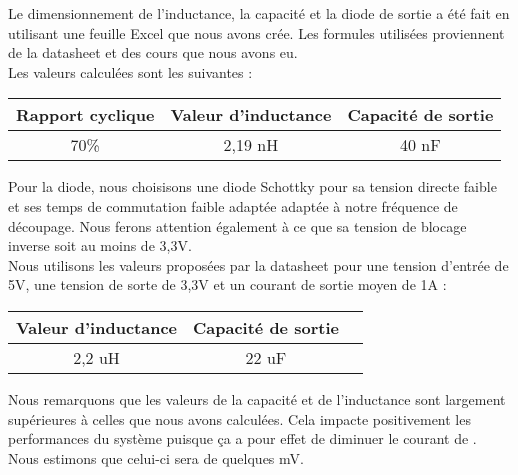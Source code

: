 \begin{itemize}
	      Le dimensionnement de l'inductance, la capacité et la diode de sortie a été fait en utilisant une feuille Excel que nous avons crée.
	      Les formules utilisées proviennent de la datasheet et des cours que nous avons eu. \\
	      Les valeurs calculées sont les suivantes :
	      	             
	      \begin{center}
	      	\begin{tabular}{|c|c|c|}
	      		\hline
	      		Rapport cyclique & Valeur d'inductance & Capacité de sortie \\
	      		\hline
	      		70\%             & 2,19 nH             & 40 nF               \\
	      		\hline
	      	\end{tabular}
	      \end{center}
	      	                  
	      Pour la diode, nous choisisons une diode Schottky pour sa tension directe faible et ses temps de commutation faible adaptée adaptée à notre fréquence de découpage.
	      Nous ferons attention également à ce que sa tension de blocage inverse soit au moins de 3,3V. \\
	      	                  
	      Nous utilisons les valeurs proposées par la datasheet pour une tension d'entrée de 5V, une tension de sorte de 3,3V et un courant de sortie moyen de 1A :
	      	                  
	      \begin{center}
	      	\begin{tabular}{|c|c|c|}
	      		\hline
	      		Valeur d'inductance & Capacité de sortie \\
	      		\hline
	      		2,2 uH              & 22 uF               \\
	      		\hline
	      	\end{tabular}
	      \end{center}
	      	                  
	      Nous remarquons que les valeurs de la capacité et de l'inductance sont largement supérieures à celles que nous avons calculées.
	      Cela impacte positivement les performances du système puisque ça a pour effet de diminuer le courant de .
	      Nous estimons que celui-ci sera de quelques mV.
	      	                  

\end{itemize}
